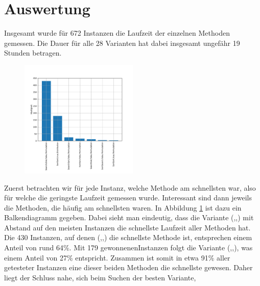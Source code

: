 



\section{Auswertung}
Insgesamt wurde für 672 Instanzen die Laufzeit der einzelnen Methoden gemessen. Die Dauer für alle 28 
Varianten hat dabei insgesamt ungefähr 19 Stunden betragen. 
\begin{figure}[h]
\centering
	\includegraphics[width = 0.5\textwidth]{figures/counting.pdf}
	\caption{ }
	\label{fig:messung_counting}
\end{figure}
Zuerst betrachten wir für jede Instanz, welche Methode am schnellsten war, also für welche die geringste
Laufzeit gemessen wurde. Interessant sind dann jeweils die Methoden, die häufig am schnellsten waren.
In Abbildung \ref{fig:messung_counting} ist dazu ein Balkendiagramm gegeben.
Dabei sieht man eindeutig, dass die Variante (\SeaUSet,\false,\perm) mit Abstand 
auf den meisten Instanzen die schnellste Laufzeit aller Methoden hat. Die
430 Instanzen, auf denen (\SeaUSet,\false,\perm) die schnellste Methode ist, entsprechen einem Anteil von rund
64\%. Mit 179 \glqq gewonnenen\grqq Instanzen folgt die Variante (\SorSor,\true,\distr), was einem Anteil von
27\% entspricht. Zusammen ist somit in etwa 91\% aller getesteter Instanzen eine dieser beiden Methoden
die schnellste gewesen. Daher liegt der Schluss nahe, sich beim Suchen der \glqq besten\grqq{} Variante,
